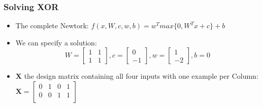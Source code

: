 \documentclass{beamer}
\begin{document}
\begin{frame}
	\frametitle{Solving XOR}
	\begin{itemize}
		\item The complete Newtork: $f(x, W, c, w, b) = w^Tmax\{0,W^Tx + c\} + b$
		\item We can specify a solution:
			$$ W = \begin{bmatrix} 1 & 1\\
						1 & 1
				\end{bmatrix} , c = \begin{bmatrix}
0\\
-1 
\end{bmatrix} , w = \begin{bmatrix}
1\\
-2
\end{bmatrix}, b = 0$$
\item $\mathbf{X}$ the design matrix containing all four inputs with one example per Column: $\mathbf{X} = \begin{bmatrix}
		0 & 1 & 0 & 1\\
	0 & 0 & 1 & 1 \\
\end{bmatrix}$
	\end{itemize}	
\end{frame}
\end{document}
